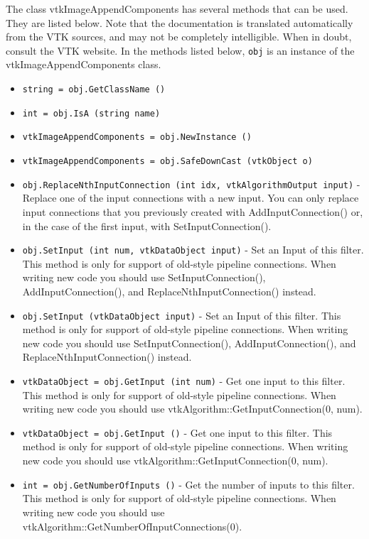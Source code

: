 The class vtkImageAppendComponents has several methods that can be used.
  They are listed below.
Note that the documentation is translated automatically from the VTK sources,
and may not be completely intelligible.  When in doubt, consult the VTK website.
In the methods listed below, \verb|obj| is an instance of the vtkImageAppendComponents class.
\begin{itemize}
\item  \verb|string = obj.GetClassName ()|

\item  \verb|int = obj.IsA (string name)|

\item  \verb|vtkImageAppendComponents = obj.NewInstance ()|

\item  \verb|vtkImageAppendComponents = obj.SafeDownCast (vtkObject o)|

\item  \verb|obj.ReplaceNthInputConnection (int idx, vtkAlgorithmOutput input)| -  Replace one of the input connections with a new input.  You can
 only replace input connections that you previously created with
 AddInputConnection() or, in the case of the first input,
 with SetInputConnection().

\item  \verb|obj.SetInput (int num, vtkDataObject input)| -  Set an Input of this filter.  This method is only for support of
 old-style pipeline connections.  When writing new code you should
 use SetInputConnection(), AddInputConnection(), and
 ReplaceNthInputConnection() instead.

\item  \verb|obj.SetInput (vtkDataObject input)| -  Set an Input of this filter.  This method is only for support of
 old-style pipeline connections.  When writing new code you should
 use SetInputConnection(), AddInputConnection(), and
 ReplaceNthInputConnection() instead.

\item  \verb|vtkDataObject = obj.GetInput (int num)| -  Get one input to this filter. This method is only for support of
 old-style pipeline connections.  When writing new code you should
 use vtkAlgorithm::GetInputConnection(0, num).

\item  \verb|vtkDataObject = obj.GetInput ()| -  Get one input to this filter. This method is only for support of
 old-style pipeline connections.  When writing new code you should
 use vtkAlgorithm::GetInputConnection(0, num).

\item  \verb|int = obj.GetNumberOfInputs ()| -  Get the number of inputs to this filter. This method is only for
 support of old-style pipeline connections.  When writing new code
 you should use vtkAlgorithm::GetNumberOfInputConnections(0).

\end{itemize}
